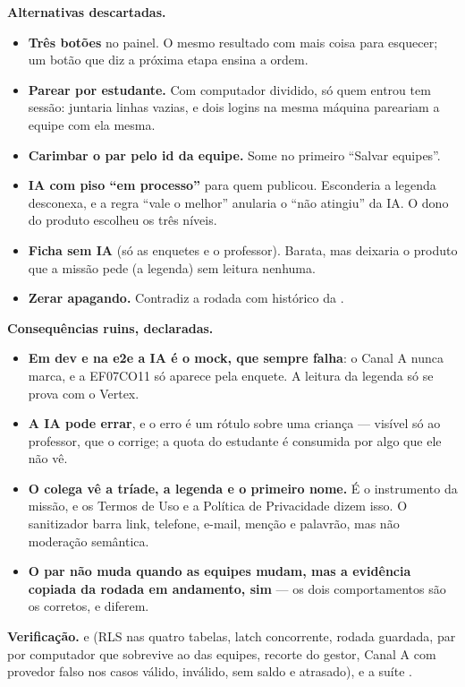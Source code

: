 \textbf{Alternativas descartadas.}

\begin{itemize}
  \item \textbf{Três botões} no painel. O mesmo resultado com mais coisa para
    esquecer; um botão que diz a próxima etapa ensina a ordem.
  \item \textbf{Parear por estudante.} Com computador dividido, só quem entrou tem
    sessão: juntaria linhas vazias, e dois logins na mesma máquina pareariam a
    equipe com ela mesma.
  \item \textbf{Carimbar o par pelo id da equipe.} Some no primeiro
    \enquote{Salvar equipes}.
  \item \textbf{IA com piso \enquote{em processo}} para quem publicou. Esconderia
    a legenda desconexa, e a regra \enquote{vale o melhor} anularia o
    \enquote{não atingiu} da IA. O dono do produto escolheu os três níveis.
  \item \textbf{Ficha sem IA} (só as enquetes e o professor). Barata, mas deixaria o
    produto que a missão pede (a legenda) sem leitura nenhuma.
  \item \textbf{Zerar apagando.} Contradiz a rodada com histórico da .
\end{itemize}

\textbf{Consequências ruins, declaradas.}

\begin{itemize}
  \item \textbf{Em dev e na e2e a IA é o mock, que sempre falha}: o Canal A nunca
    marca, e a EF07CO11 só aparece pela enquete. A leitura da legenda só se prova
    com o Vertex.
  \item \textbf{A IA pode errar}, e o erro é um rótulo sobre uma criança --- visível
    só ao professor, que o corrige; a quota do estudante é consumida por algo que
    ele não vê.
  \item \textbf{O colega vê a tríade, a legenda e o primeiro nome.} É o instrumento
    da missão, e os Termos de Uso e a Política de Privacidade dizem isso. O
    sanitizador barra link, telefone, e-mail, menção e palavrão, mas não
    moderação semântica.
  \item \textbf{O par não muda quando as equipes mudam, mas a evidência copiada da
    rodada em andamento, sim} --- os dois comportamentos são os corretos, e
    diferem.
\end{itemize}

\textbf{Verificação.}  e 
(RLS nas quatro tabelas, latch concorrente, rodada guardada, par por computador que
sobrevive ao  das equipes, recorte do gestor, Canal A com provedor falso
nos casos válido, inválido, sem saldo e atrasado), e a suíte
.

